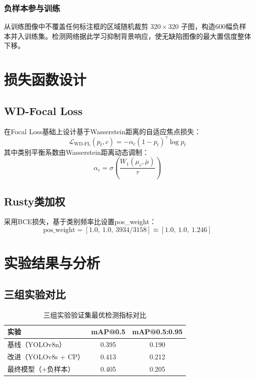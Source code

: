 \documentclass[12pt,a4paper]{ctexart}
\theoremstyle{cumcm}
\begin{document}
\subsubsection{负样本参与训练}

从训练图像中不覆盖任何标注框的区域随机裁剪 $320\times320$ 子图，构造600幅负样本并入训练集。检测网络据此学习抑制背景响应，使无缺陷图像的最大置信度整体下移。

\section{损失函数设计}

\subsection{WD-Focal Loss}

在Focal Loss基础上设计基于Wasserstein距离的自适应焦点损失：
\begin{equation}
\mathcal{L}_{\mathrm{WD\text{-}FL}}(p_t,c) = -\alpha_c (1-p_t)^{\gamma}\log p_t
\end{equation}
其中类别平衡系数由Wasserstein距离动态调制：
\begin{equation}
\alpha_c = \sigma\!\left(\frac{W_1(\mu_c,\bar{\mu})}{\tau}\right)
\end{equation}

\subsection{Rusty类加权}

采用BCE损失，基于类别频率比设置pos\_weight：
\begin{equation}
\mathrm{pos\_weight} = [1.0,\ 1.0,\ 3934/3158] \approx [1.0,\ 1.0,\ 1.246]
\end{equation}

\section{实验结果与分析}

\subsection{三组实验对比}

\begin{table}[H]
\centering
{}
\caption{三组实验验证集最优检测指标对比}
\begin{tabular}{lcc}
\toprule
\textbf{实验} & \textbf{mAP@0.5} & \textbf{mAP@0.5:0.95} \\
\midrule
基线（YOLOv8n） & 0.395 & 0.190 \\
改进（YOLOv8s + CP） & 0.413 & 0.212 \\
最终模型（+负样本） & 0.405 & 0.205 \\
\bottomrule
\end{tabular}
\end{table}
\end{document}
